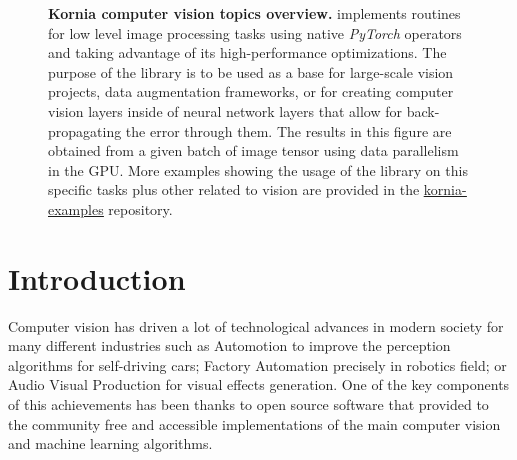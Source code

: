 \begin{figure}[h]
\begin{center}
\begin{tabular}{c c c c c}
        \end{tabular}
    \end{center}
    \caption[Kornia computer vision topics overview]{\textbf{Kornia computer vision topics overview.} \lib{} implements routines for low level image processing tasks using native \textit{PyTorch} operators and taking advantage of its high-performance optimizations. The purpose of the library is to be used as a base for large-scale vision projects, data augmentation frameworks, or for creating computer vision layers inside of neural network layers that allow for back-propagating the error through them. The results in this figure are obtained from a given batch of image tensor using data parallelism in the GPU. More examples showing the usage of the library on this specific tasks plus other related to vision are provided in the \underline{\color{blue}\href{https://github.com/kornia/kornia-examples}{kornia-examples}} repository.}
    \label{fig:imgproc}
\end{figure}

\newpage
\section{Introduction}

Computer vision has driven a lot of technological advances in modern society for many different industries such as Automotion to improve the perception algorithms for self-driving cars; Factory Automation precisely in robotics field; or Audio Visual Production for visual effects generation. One of the key components of this achievements has been thanks to open source software that provided to the community free and accessible implementations of the main computer vision and machine learning algorithms.

